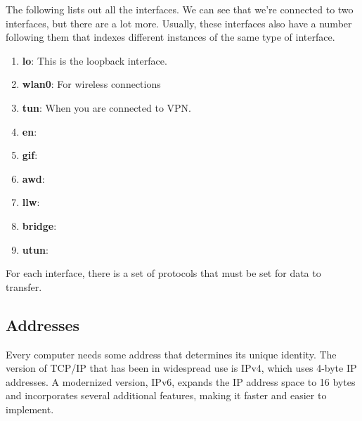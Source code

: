 \documentclass{article}
\begin{document}
    The following lists out all the interfaces. We can see that we're connected to two interfaces, but there are a lot more. Usually, these interfaces also have a number following them that indexes different instances of the same type of interface. 

    \begin{enumerate} 
      \item \textbf{lo}: This is the loopback interface. 
      \item \textbf{wlan0}: For wireless connections 
      \item \textbf{tun}: When you are connected to VPN. 
      \item \textbf{en}: 
      \item \textbf{gif}: 
      \item \textbf{awd}: 
      \item \textbf{llw}: 
      \item \textbf{bridge}: 
      \item \textbf{utun}: 
    \end{enumerate}

    For each interface, there is a set of protocols that must be set for data to transfer. 

  \subsection{Addresses}

    Every computer needs some address that determines its unique identity. The version of TCP/IP that has been in widespread use is IPv4, which uses 4-byte IP addresses. A modernized version, IPv6, expands the IP address space to 16 bytes and incorporates several additional features, making it faster and easier to implement. 
\end{document}
